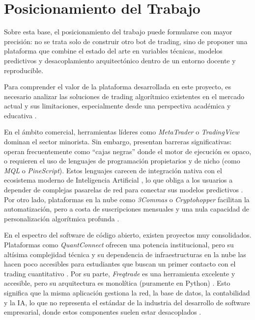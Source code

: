 \section{Posicionamiento del Trabajo}

Sobre esta base, el posicionamiento del trabajo puede formularse con mayor precisión: no se trata solo de construir otro bot de trading, sino de proponer una plataforma que combine el estado del arte en variables técnicas, modelos predictivos y desacoplamiento arquitectónico dentro de un entorno docente y reproducible.

Para comprender el valor de la plataforma desarrollada en este proyecto, es necesario analizar las soluciones de trading algorítmico existentes en el mercado actual y sus limitaciones, especialmente desde una perspectiva académica y educativa \parencite{lusardi_economic_2014}.

En el ámbito comercial, herramientas líderes como \textit{MetaTrader} o \textit{TradingView} dominan el sector minorista. Sin embargo, presentan barreras significativas: operan frecuentemente como ``cajas negras'' donde el motor de ejecución es opaco, o requieren el uso de lenguajes de programación propietarios y de nicho (como \textit{MQL} o \textit{PineScript}). Estos lenguajes carecen de integración nativa con el ecosistema moderno de Inteligencia Artificial \parencite{goodfellow_deep_2016}, lo que obliga a los usuarios a depender de complejas pasarelas de red para conectar sus modelos predictivos \parencite{newman_building_2015}. Por otro lado, plataformas en la nube como \textit{3Commas} o \textit{Cryptohopper} facilitan la automatización, pero a costa de suscripciones mensuales y una nula capacidad de personalización algorítmica profunda \parencite{hasso_who_2019}.

En el espectro del software de código abierto, existen proyectos muy consolidados. Plataformas como \textit{QuantConnect} ofrecen una potencia institucional, pero su altísima complejidad técnica y su dependencia de infraestructuras en la nube las hacen poco accesibles para estudiantes que buscan un primer contacto con el trading cuantitativo \parencite{lusardi_economic_2014}. Por su parte, \textit{Freqtrade} \parencite{freqtrade_development_team_freqtrade_2023} es una herramienta excelente y accesible, pero su arquitectura es monolítica (puramente en Python) \parencite{freqtrade_team_freqtrade_2026}. Esto significa que la misma aplicación gestiona la red, la base de datos, la contabilidad y la IA, lo que no representa el estándar de la industria del desarrollo de software empresarial, donde estos componentes suelen estar desacoplados \parencite{richards_software_2022}.


